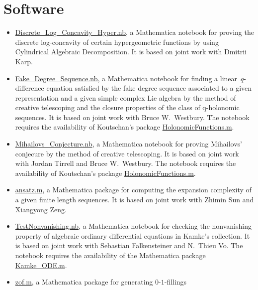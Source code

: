 \documentclass[a4paper,12pt]{article}
\begin{document}
\section*{\Large{Software}}
\begin{itemize}
\item \href{https://yzhang1616.github.io/lch/Discrete_Log_Concavity_Hyper.nb}{Discrete\_Log\_Concavity\_Hyper.nb}, a Mathematica notebook for proving the discrete log-concavity of certain hypergeometric functions by using Cylindrical Algebraic Decomposition. It is based on joint work with Dmitrii Karp.
\item \href{https://yzhang1616.github.io/fd/Fake_Degree_Sequence.nb}{Fake\_Degree\_Sequence.nb},  a Mathematica notebook for finding a linear~$q$-difference equation satisfied by the fake degree sequence associated to a given representation and a given simple complex Lie algebra by the method of creative telescoping and the closure properties of the class of q-holonomic sequences.  It is based on joint work
    with Bruce W.\ Westbury.  The notebook requires the availability of Koutschan's package 
 \href{http://www.risc.jku.at/research/combinat/software/ergosum/RISC/HolonomicFunctions.html}{HolonomicFunctions.m}. 
\item \href{https://yzhang1616.github.io/ct/Mihailovs_Conjecture.nb}{Mihailovs\_Conjecture.nb},  a Mathematica notebook for 
proving Mihailovs' conjecure by the method of creative telescoping. It is based on joint work
with Jordan Tirrell and Bruce W.\ Westbury.   The notebook requires the availability of Koutschan's package 
 \href{http://www.risc.jku.at/research/combinat/software/ergosum/RISC/HolonomicFunctions.html}{HolonomicFunctions.m}.
\item \href{https://yzhang1616.github.io/complexity/ansatz.m}{ansatz.m}, 
a Mathematica package for computing the expansion complexity of a given finite length sequences. 
It is based on joint work with Zhimin Sun and Xiangyong Zeng. 
  \item \href{https://yzhang1616.github.io/TestNonvanishing.nb}{TestNonvanishing.nb}, 
    a Mathematica notebook for checking the nonvanishing property of algebraic ordinary
    differential equations in Kamke's collection. It is based on joint work
    with Sebastian Falkensteiner and N.\ Thieu Vo. 
    The notebook requires the availability of the Mathematica package \href{https://yzhang1616.github.io/Kamke_ODE.m}{Kamke\_ODE.m}.
  \item \href{https://yzhang1616.github.io/zof/zof.m}{zof.m}, a Mathematica package for generating $0$-$1$-fillings 

\end{itemize}
\end{document}
